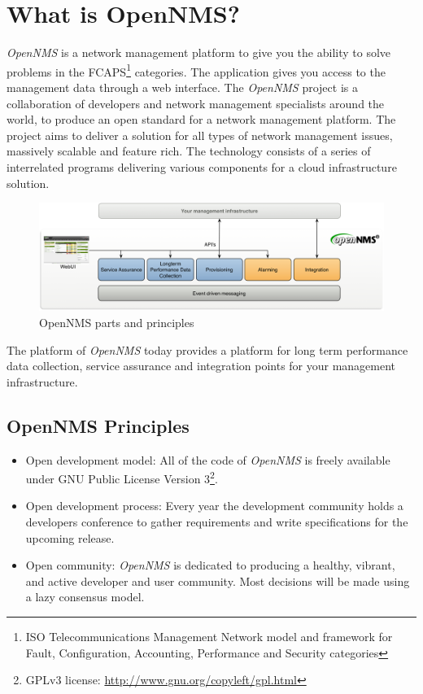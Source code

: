 \section{What is OpenNMS?}
\emph{OpenNMS} is a network management platform to give you the ability to solve problems in the FCAPS\footnote{ISO Telecommunications Management Network model and framework for Fault, Configuration, Accounting, Performance and Security categories} categories. The application gives you access to the management data through a web interface. The \emph{OpenNMS} project is a collaboration of developers and network management specialists around the world, to produce an open standard for a network management platform. The project aims to deliver a solution for all types of network management issues, massively scalable and feature rich. The technology consists of a series of interrelated programs delivering various components for a cloud infrastructure solution.

\begin{figure}[h]
	\centering
	\includegraphics[width=1.0\textwidth]{images/opennms-principles.png}
	\caption{OpenNMS parts and principles}
	\label{fig:opennms-principles}
\end{figure}

The platform of \emph{OpenNMS} today provides a platform for long term performance data collection, service assurance and integration points for your management infrastructure.

\subsection{OpenNMS Principles}
\begin{itemize}
  \item Open development model: All of the code of \emph{OpenNMS} is freely available under GNU Public License Version 3\footnote{GPLv3 license: \url{http://www.gnu.org/copyleft/gpl.html}}.
  \item Open development process: Every year the development community holds a developers conference to gather requirements and write specifications for the upcoming release.
  \item Open community: \emph{OpenNMS} is dedicated to producing a healthy, vibrant, and active developer and user community. Most decisions will be made using a lazy consensus model.
\end{itemize}

